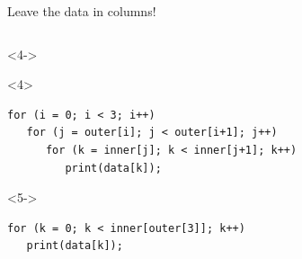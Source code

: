 \documentclass[aspectratio=169]{beamer}
\begin{document}
\begin{frame}[fragile]{Leave the data in columns!}
\begin{columns}[t]
\begin{uncoverenv}<4->
\mbox{\hspace{-0.1 cm}}

\small
\vspace{-0.25 cm}
\begin{onlyenv}<4>
\begin{verbatim}
for (i = 0; i < 3; i++)
   for (j = outer[i]; j < outer[i+1]; j++)
      for (k = inner[j]; k < inner[j+1]; k++)
         print(data[k]);
\end{verbatim}
\end{onlyenv}
\begin{onlyenv}<5->
\begin{verbatim}
for (k = 0; k < inner[outer[3]]; k++)
   print(data[k]);
\end{verbatim}
\end{onlyenv}
\end{uncoverenv}
\end{columns}

\vspace{0.5 cm}
\end{frame}

\begin{frame}{}

\end{frame}
\end{document}
